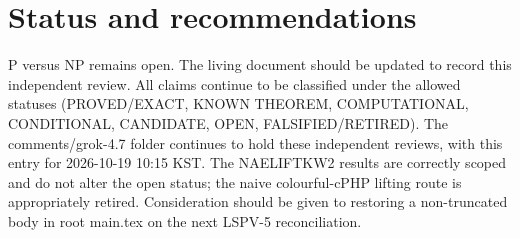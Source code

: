 \documentclass[11pt]{article}
\begin{document}
\section{Status and recommendations}
P versus NP remains open. The living document should be updated to record this independent review. All claims continue to be classified under the allowed statuses (PROVED/EXACT, KNOWN THEOREM, COMPUTATIONAL, CONDITIONAL, CANDIDATE, OPEN, FALSIFIED/RETIRED). The comments/grok-4.7 folder continues to hold these independent reviews, with this entry for 2026-10-19 10:15 KST. The NAELIFTKW2 results are correctly scoped and do not alter the open status; the naive colourful-cPHP lifting route is appropriately retired. Consideration should be given to restoring a non-truncated body in root main.tex on the next LSPV-5 reconciliation.

\end{document}
